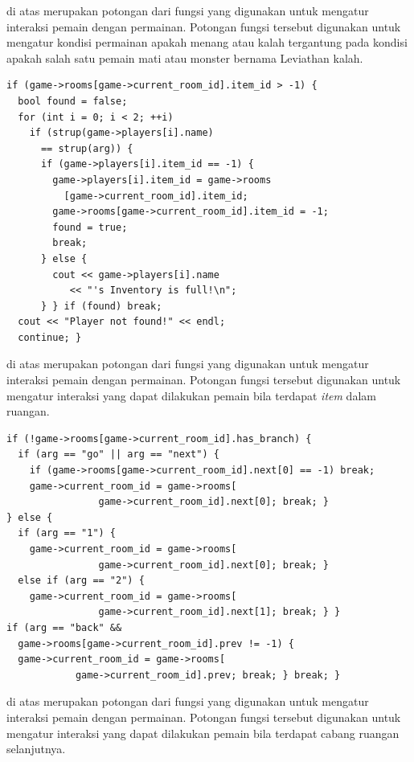 \documentclass[../main.tex]{subfiles}
\begin{document}
{\Script} di atas merupakan potongan dari fungsi  yang digunakan untuk mengatur interaksi pemain dengan permainan. Potongan fungsi tersebut digunakan untuk mengatur kondisi permainan apakah menang atau kalah tergantung pada kondisi apakah salah satu pemain mati atau monster bernama Leviathan kalah.

\begin{code}
\begin{verbatim}
if (game->rooms[game->current_room_id].item_id > -1) {
  bool found = false;
  for (int i = 0; i < 2; ++i)
    if (strup(game->players[i].name)
      == strup(arg)) {
      if (game->players[i].item_id == -1) {
        game->players[i].item_id = game->rooms
          [game->current_room_id].item_id;
        game->rooms[game->current_room_id].item_id = -1;
        found = true;
        break;
      } else {
        cout << game->players[i].name
           << "'s Inventory is full!\n";
      } } if (found) break;
  cout << "Player not found!" << endl;
  continue; }
\end{verbatim}
\end{code}

{\Script} di atas merupakan potongan dari fungsi  yang digunakan untuk mengatur interaksi pemain dengan permainan. Potongan fungsi tersebut digunakan untuk mengatur interaksi yang dapat dilakukan pemain bila terdapat \textit{item} dalam ruangan.

\begin{code}
\begin{verbatim}
if (!game->rooms[game->current_room_id].has_branch) {
  if (arg == "go" || arg == "next") {
    if (game->rooms[game->current_room_id].next[0] == -1) break;
    game->current_room_id = game->rooms[
                game->current_room_id].next[0]; break; }
} else {
  if (arg == "1") {
    game->current_room_id = game->rooms[
                game->current_room_id].next[0]; break; }
  else if (arg == "2") {
    game->current_room_id = game->rooms[
                game->current_room_id].next[1]; break; } }
if (arg == "back" &&
  game->rooms[game->current_room_id].prev != -1) {
  game->current_room_id = game->rooms[
            game->current_room_id].prev; break; } break; }
\end{verbatim}
\end{code}

{\Script} di atas merupakan potongan dari fungsi  yang digunakan untuk mengatur interaksi pemain dengan permainan. Potongan fungsi tersebut digunakan untuk mengatur interaksi yang dapat dilakukan pemain bila terdapat cabang ruangan selanjutnya.
\end{document}
